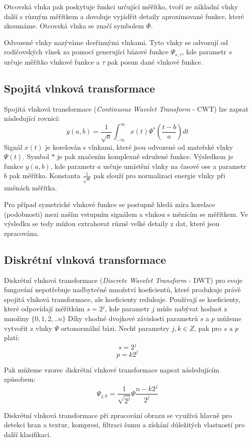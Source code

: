 Otcovská vlnka pak poskytuje funkci určující měřítko, tvoří ze základní vlnky další s různým měřítkem a dovoluje vyjádřit detaily aproximované funkce, které zkoumáme. Otcovská vlnka se značí symbolem $\Phi$.

Odvozené vlnky nazýváme dceřinnými vlnkami. Tyto vlnky se odvozují od rodičovských vlnek za pomocí generující bázové funkce $\Psi_{s,\tau}$, kde parametr $s$ určuje měřítko vlnkové funkce a $\tau$ pak posun dané vlnkové funkce.\cite{WaveletHlavac}

\subsection{Spojitá vlnková transformace}
Spojitá vlnková transformace (\textit{Continuous Wavelet Transform} - CWT) lze zapsat následující rovnicí:\cite{WaveletMathworks}
$$y(a,b) = \frac{1}{\sqrt{a}}\int_{-\infty}^{\infty} x(t)\Psi^*(\frac{t-b}{a}) dt$$
Signál $x(t)$ je korelován s vlnkami, které jsou odvozené od mateřské vlnky $\Psi(t)$. Symbol $*$ je pak značením komplexně sdružené funkce. Výsledkem je funkce $y(a,b)$, kde parametr $a$ určuje umístění vlnky na časové ose a parametr $b$ pak měřítko. Konstanta $\frac{1}{\sqrt{a}}$ pak slouží pro normalizaci energie vlnky při změnách měřítka.

Pro případ symetrické vlnkové funkce se postupně hledá míra korelace (podobnosti) mezi naším vstupním signálem a vlnkou s měnícím se měřítkem. Ve výsledku se tedy můžou extrahovat různě velké detaily z dat, které jsou zpracována.\cite{WaveletElektrorevue}

\subsection{Diskrétní vlnková transformace}
Diskrétní vlnková transformace (\textit{Discrete Wavelet Transform} - DWT) pro svoje fungování nepotřebuje nadbytečné množství koeficientů, které produkuje právě spojitá vlnková transformace, ale koeficienty redukuje. Používají se koeficienty, které odpovídají měřítkům $s = 2^j$, kde parametr $j$ může nabývat hodnot z množiny $\{0,1,2,..n\}$ Díky vhodné dvojkové závislosti parametrů $s$ a $p$ můžeme vytvořit z vlnky $\Psi$ ortonormální bázi. Nechť parametry $j, k \in Z$, pak pro $s$ a $p$ platí:
$$s = 2^j$$
$$p = k2^j$$

Pak můžeme vzorec diskrétní vlnkové transformace napsat následujícím způsobem:
$$\Psi_{j,k} = \frac{1}{\sqrt{2^j}}\Psi\frac{n-k2^j}{2^j}$$

Diskrétní vlnková transformace při zpracování obrazu se využívá hlavně pro detekci hran a textur, kompresi, filtraci šumu a získání důležitých vlastností pro další klasifikaci.\cite{WaveletElektrorevue}

